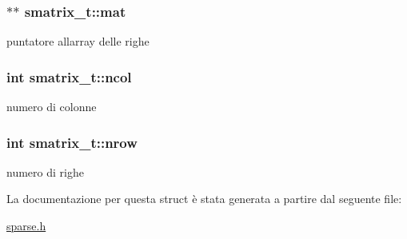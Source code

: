 \subsubsection[{\texorpdfstring{mat}{mat}}]{$\ast$$\ast$ smatrix\+\_\+t\+::mat}\hypertarget{structsmatrix__t_aa60ccb45be474ec81f6daab4fcdab2c4}{}\label{structsmatrix__t_aa60ccb45be474ec81f6daab4fcdab2c4}
puntatore all\textquotesingle{}array delle righe 
\subsubsection[{\texorpdfstring{ncol}{ncol}}]{\setlength{\rightskip}{0pt plus 5cm}int smatrix\+\_\+t\+::ncol}\hypertarget{structsmatrix__t_a7a7218430298fc18a42dfa43ecc41635}{}\label{structsmatrix__t_a7a7218430298fc18a42dfa43ecc41635}
numero di colonne 
\subsubsection[{\texorpdfstring{nrow}{nrow}}]{\setlength{\rightskip}{0pt plus 5cm}int smatrix\+\_\+t\+::nrow}\hypertarget{structsmatrix__t_ae0b8f31ddab7ed23ca14a46758291f37}{}\label{structsmatrix__t_ae0b8f31ddab7ed23ca14a46758291f37}
numero di righe 

La documentazione per questa struct è stata generata a partire dal seguente file\+:\begin{DoxyCompactItemize}
\item 
\hyperlink{sparse_8h}{sparse.\+h}\end{DoxyCompactItemize}
